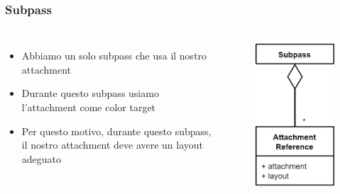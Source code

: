 \begin{frame}
\frametitle{Subpass}
\begin{columns}


\begin{itemize}
\item Abbiamo un solo subpass che usa il nostro attachment
\item Durante questo subpass usiamo l'attachment come color target
\item Per questo motivo, durante questo subpass, il nostro attachment deve avere un layout adeguato
\end{itemize}


\begin{figure}[ht]
    \centering
    \includegraphics[scale=0.3]{images/SlidesClearWindow/Subpass.png}
\end{figure}

\end{columns}
\end{frame}
